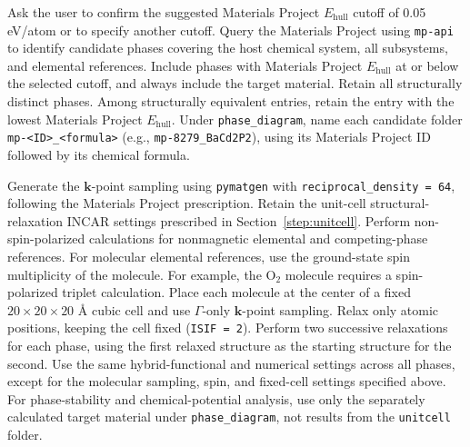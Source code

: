 \documentclass[aip,jap,reprint,amsmath,amssymb]{revtex4-2}
\begin{document}
Ask the user to confirm the suggested Materials Project $E_{\mathrm{hull}}$ cutoff of 0.05 eV/atom or to specify another cutoff. Query the Materials Project using \texttt{mp-api} to identify candidate phases covering the host chemical system, all subsystems, and elemental references. Include phases with Materials Project $E_{\mathrm{hull}}$ at or below the selected cutoff, and always include the target material. Retain all structurally distinct phases. Among structurally equivalent entries, retain the entry with the lowest Materials Project $E_{\mathrm{hull}}$. Under \texttt{phase\_diagram}, name each candidate folder \texttt{mp-<ID>\_<formula>} (e.g., \texttt{mp-8279\_BaCd2P2}), using its Materials Project ID followed by its chemical formula.

Generate the $\bm{k}$-point sampling using \texttt{pymatgen} with \texttt{reciprocal\_density = 64}, following the Materials Project prescription.\cite{Jain2013} Retain the unit-cell structural-relaxation INCAR settings prescribed in Section~\ref{step:unitcell}. Perform non-spin-polarized calculations for nonmagnetic elemental and competing-phase references. For molecular elemental references, use the ground-state spin multiplicity of the molecule. For example, the O$_2$ molecule requires a spin-polarized triplet calculation. Place each molecule at the center of a fixed $20\times20\times20$ \AA{} cubic cell and use $\Gamma$-only $\bm{k}$-point sampling. Relax only atomic positions, keeping the cell fixed (\texttt{ISIF = 2}). Perform two successive relaxations for each phase, using the first relaxed structure as the starting structure for the second. Use the same hybrid-functional and numerical settings across all phases, except for the molecular sampling, spin, and fixed-cell settings specified above. For phase-stability and chemical-potential analysis, use only the separately calculated target material under \texttt{phase\_diagram}, not results from the \texttt{unitcell} folder.
\end{document}
